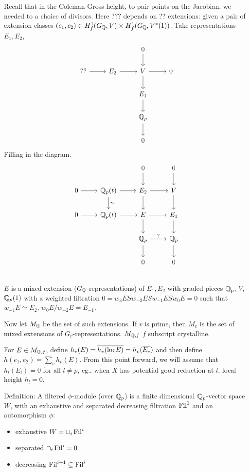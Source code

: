 Recall that in the Coleman-Gross height, to pair points on the Jacobian, we needed to a choice of divisors. Here ??? depends on ?? extensions: given a pair of extension classes $(c_1,c_2) \in H_f^1(G_{\mathbb{Q}},V) \times H_f^1(G_{\mathbb{Q}}, V^*(1))$. Take representations $E_1,E_2$,
	\[
	\begin{tikzcd}
	&&  0 \arrow{d} \\
	?? \arrow{r} & E_2 \arrow{r} & V \arrow{r} \arrow{d} & 0 \\
	&& E_1 \arrow{d} \\
	&& \Qp \arrow{d} \\
	&& 0
	\end{tikzcd}
	\]
Filling in the diagram. 
	\[
	\begin{tikzcd}
	& & 0 \arrow{d} & 0 \arrow{d} \\
	0 \arrow{r} & \Q_p(t) \arrow{r} \arrow{d}{\sim} &  E_2 \arrow{r} \arrow{d} & V \arrow{d} \\
	0 \arrow{r} & \Q_p(t) \arrow{r} &  E \arrow{r} \arrow{d} & E_1 \arrow{d} \\
	& & \Q_p \arrow{r}{?} \arrow{d} & \Qp \arrow{d} \\
	& & 0 & 0 \\
	\end{tikzcd}
	\]
$E$ is a mixed extension ($G_{\mathbb{Q}}$-representations) of $E_1,E_2$ with graded pieces $\mathbb{Q}_p$, $V$, $\mathbb{Q}_p(1)$ with a weighted filtration $0= w_3 ES w_{-2} ES w_{-1} E S w_0 E= 0$ such that $w_{-1} E \simeq E_2$, $w_0E/w_{-2}E= E_{-1}$.


Now let $M_{\mathbb{Q}}$ be the set of such extensions. If $v$ is prime, then $M_v$ is the set of mixed extensions of $G_v$-representations. $M_{\mathbb{Q},f}$ $f$ subscript crystalline. 


For $E \in M_{\mathbb{Q},f}$, define $h_v(E)= \overline{h_v(\text{loc} E)}= h_v(\overline{E_v})$ and then define $h(e_1,e_2)= \sum_v h_v(E)$. From this point forward, we will assume that $h_l(E_l)= 0$ for all $l \neq p$, eg.. when $X$ has potential good reduction at $l$, local height $h_l= 0$.


Definition: A filtered $\phi$-module (over $\mathbb{Q}_p$) is a finite dimensional $\mathbb{Q}_p$-vector space $W$, with an exhaustive and separated decreasing filtration $\operatorname{Fil}^1$ and an automorphism $\phi$:

\begin{itemize}
\item exhaustive $W= \cup_i \operatorname{Fil}^i$
\item separated $\cap_i \operatorname{Fil}^i= 0$
\item decreasing $\operatorname{Fil}^{i+1} \subseteq \operatorname{Fil}^i$
\end{itemize}


